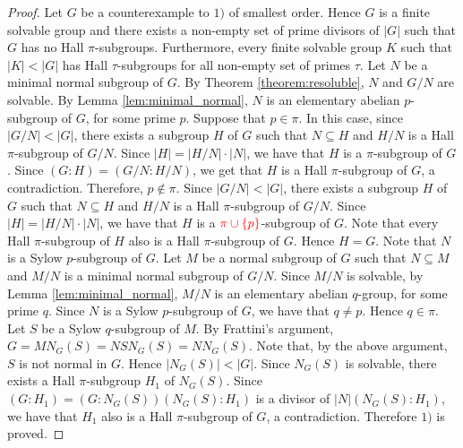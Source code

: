\begin{proof}
    Let $G$ be a counterexample to $1)$ of smallest order. Hence $G$ is a finite solvable group and
    there exists a non-empty set of prime divisors of $|G|$ such that $G$ has no Hall $\pi$-subgroups. Furthermore, every finite solvable group $K$ such that $|K|<|G|$ has Hall $\tau$-subgroups for all non-empty set of primes $\tau$. Let $N$ be a minimal normal subgroup of $G$. By Theorem \ref{theorem:resoluble}, $N$ and $G/N$ are solvable. By Lemma \ref{lem:minimal_normal}, $N$ is an elementary abelian $p$-subgroup of $G$, for some prime $p$.
    Suppose that $p\in\pi$. In this case, since $|G/N|<|G|$, there exists a subgroup $H$ of $G$ such that $N\subseteq H$ and $H/N$ is a Hall $\pi$-subgroup
    of $G/N$. Since $|H|=|H/N|\cdot |N|$, we have that $H$ is a $\pi$-subgroup of $G$. Since $(G:H)=(G/N:H/N)$, we get that $H$ is a Hall $\pi$-subgroup of $G$, a contradiction. Therefore, $p\notin \pi$. Since $|G/N|<|G|$, there exists a subgroup $H$ of $G$ such that $N\subseteq H$ and $H/N$ is a Hall $\pi$-subgroup
    of $G/N$. Since $|H|=|H/N|\cdot |N|$, we have that $H$ is a $\textcolor{red}{\pi\cup\{ p\}}$-subgroup of $G$. Note that every Hall $\pi$-subgroup of $H$ also is a Hall $\pi$-subgroup of $G$. Hence $H=G$. Note that $N$ is a Sylow $p$-subgroup of $G$. Let $M$ be a normal subgroup of $G$ such that $N\subseteq M$ and $M/N$ is a minimal normal subgroup of $G/N$. Since $M/N$ is solvable, by Lemma \ref{lem:minimal_normal}, $M/N$ is an elementary abelian $q$-group, for some prime $q$. Since $N$ is a Sylow $p$-subgroup of $G$, we have that $q\neq p$. Hence $q\in \pi$. Let $S$ be a Sylow $q$-subgroup of $M$. By Frattini's argument, $G=MN_G(S)=NSN_G(S)=NN_G(S)$. Note that, by the above argument, $S$ is not normal in $G$. Hence $|N_G(S)|<|G|$. Since $N_G(S)$ is solvable, there exists a Hall $\pi$-subgroup $H_1$ of $N_G(S)$. Since $(G:H_1)=(G:N_G(S))(N_G(S):H_1)$ is a divisor of $|N|(N_G(S):H_1)$, we have that $H_1$ also is a Hall $\pi$-subgroup of $G$, a contradiction. Therefore $1)$ is proved.
    

\end{proof}
